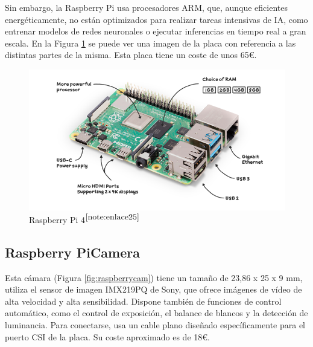 Sin embargo, la Raspberry Pi usa procesadores ARM, que, aunque eficientes energéticamente, no están optimizados para realizar tareas intensivas de \ac{IA}, como entrenar modelos de redes neuronales o ejecutar inferencias en tiempo real a gran escala. En la Figura \ref{fig:raspberry} se puede ver una imagen de la placa con referencia a las distintas partes de la misma. Esta placa tiene un coste de unos 65€. 


\begin{figure} [h!]
	\begin{center}
		\includegraphics[width=14cm]{figs/raspberrypi4.png}
	\end{center}
	\caption{Raspberry Pi 4$^{\ref{note:enlace25}}$} 
\label{fig:raspberry}
\end{figure}

\setcounter{footnote}{25} %

\subsection{Raspberry PiCamera}
\label{subsec:picamera}

Esta cámara (Figura \ref{fig:raspberrycam}) tiene un tamaño de 23,86 x 25 x 9 mm, utiliza el sensor de imagen IMX219PQ de Sony, que ofrece imágenes de vídeo de alta velocidad y alta sensibilidad. Dispone también de funciones de control automático, como el control de exposición, el balance de blancos y la detección de luminancia. Para conectarse, usa un cable plano diseñado específicamente para el puerto \ac{CSI} de la placa. Su coste aproximado es de 18€. 



